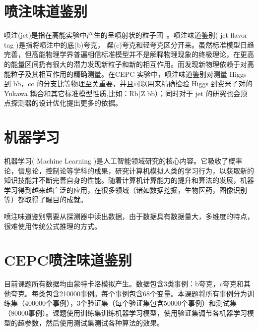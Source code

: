\section{喷注味道鉴别}
喷注(jet)是指在高能实验中产生的呈喷射状的粒子团~\cite{jet}。喷注味道鉴别( jet flavor tag )是指将喷注中的底(b)夸克， 粲(c)夸克和轻夸克区分开来。虽然标准模型日趋完善，但高能物理学界普遍相信标准模型并不是解释物理现象的终极理论，在更高的能量区间扔有很大的潜力发现新粒子和新的相互作用。而发现新物理依赖于对高能粒子及其相互作用的精确测量。在CEPC 实验中，喷注味道鉴别对测量 Higgs 到 bb，cc 的分支比等物理至关重要，并且可以用来精确检验 Higgs 到费米子对的Yukawa 耦合和其它标准模型性质,比如：Rb(Zbb）；同时对于 jet 的研究也会顶点探测器的设计优化提出更多的依据。

\section{机器学习}
机器学习( Machine Learning )是人工智能领域研究的核心内容。它吸收了概率论，信息论，控制论等学科的成果，研究计算机模拟人类的学习行为，以获取新的知识技能并不断完善自身的性能。随着计算机计算能力的提升和算法的发展，机器学习得到越来越广泛的应用，在很多领域（诸如数据挖掘，生物医药，图像识别等）都取得了瞩目的成就。

喷注味道鉴别需要从探测器中读出数据，由于数据具有数据量大，多维度的特点，很难使用传统公式推理的方式。
\section{CEPC喷注味道鉴别}
目前课题所有数据均由蒙特卡洛模拟产生。数据包含3类事例：b夸克，c夸克和其他夸克。每类包含210000事例。每个事例包含68个变量。本课题将所有事例分为训练集（400000个事例），3个验证集（每个验证集包含50000个事例）和测试集（80000事例）。课题使用训练集训练机器学习模型，使用验证集调节各机器学习模型的超参数，然后使用测试集测试各种算法的效果。

